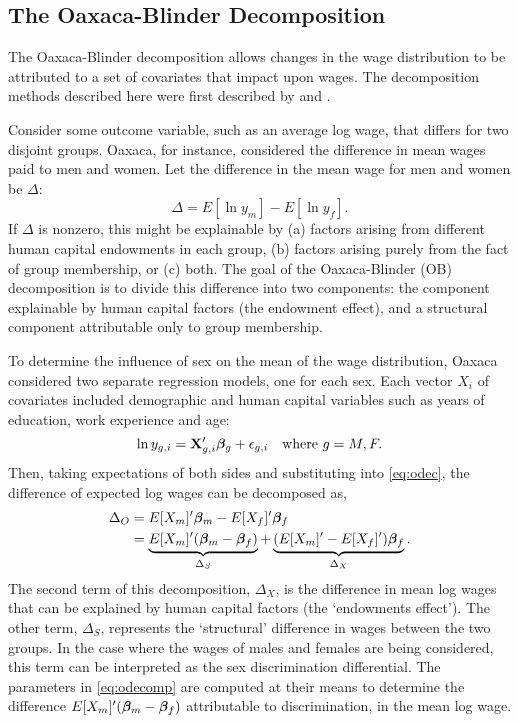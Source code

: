 \cite{Borland1999}

\cite{Baron2010}

\subsection{The Oaxaca-Blinder Decomposition}

The Oaxaca-Blinder decomposition allows changes in the wage distribution to be attributed to a set of covariates that impact upon wages. The decomposition methods described here were first described by \citet{Oaxaca1973} and \citet{Blinder1973}. 

Consider some outcome variable, such as an average log wage, that differs for two disjoint groups. Oaxaca, for instance, considered the difference in mean wages paid to men and women. Let the difference in the mean wage for men and women be $\Delta$:
\begin{equation} \Delta = E[\ln y_m] - E[\ln y_f]. \label{eq:odec} \end{equation}
If $\Delta$ is nonzero, this might be explainable by (a) factors arising from different human capital endowments in each group, (b) factors arising purely from the fact of group membership, or (c) both. The goal of the Oaxaca-Blinder (OB) decomposition is to divide this difference into two components: the component explainable by human capital factors (the endowment effect), and a structural component attributable only to group membership.

To determine the influence of sex on the mean of the wage distribution, Oaxaca considered two separate regression models, one for each sex. Each vector $X_i$ of covariates included demographic and human capital variables such as years of education, work experience and age:
$$  \ln y_{g,i} = \mathbf{X}_{g,i}'\boldsymbol{\beta}_g + \epsilon_{g,i} \quad \text{where}\ g=M,F. $$
Then, taking expectations of both sides and substituting into \eqref{eq:odec}, the difference of expected log wages can be decomposed as,
\begin{align}
  \Delta_O &= E[X_m]'\boldsymbol{\beta}_m -  E[X_f]'\boldsymbol{\beta}_f \notag \\
  &= \underbrace{E[X_m]'(\boldsymbol{\beta}_m - \boldsymbol{\beta}_f)}_{\Delta_S} + \underbrace{(E[X_m]'-E[X_f]')\boldsymbol{\beta}_f}_{\Delta_X}. \label{eq:odecomp}
\end{align}
The second term of this decomposition, $\Delta_X$, is the difference in mean log wages that can be explained by human capital factors (the `endowments effect'). The other term, $\Delta_S$, represents the `structural' difference in wages between the two groups. In the case where the wages of males and females are being considered, this term can be interpreted as the sex discrimination differential. The parameters in \eqref{eq:odecomp} are computed at their means to determine the difference $E[X_m]'(\boldsymbol{\beta}_m - \boldsymbol{\beta}_f)$ attributable to discrimination, in the mean log wage.

